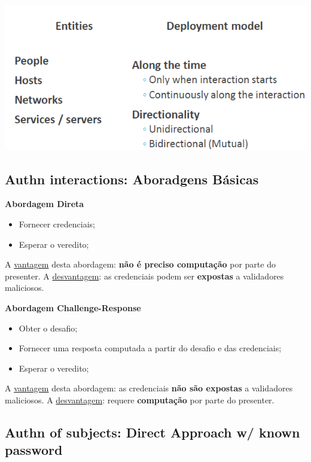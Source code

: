 \documentclass{article}
\begin{document}
\vspace{2mm}

\begin{center}
  \includegraphics[scale=0.55]{20}
\end{center}

\pagebreak

\subsection{Authn interactions: Aboradgens Básicas}

\begin{flushleft}
  \textbf{Abordagem Direta}
  \begin{itemize}
    \item Fornecer credenciais;
    \item Esperar o veredito;
  \end{itemize}
  A \uline{vantagem} desta abordagem: \textbf{não é preciso computação} por parte do presenter.
  A \uline{desvantagem}: as credenciais podem ser \textbf{expostas} a validadores maliciosos.

  \vspace{2mm}

  \textbf{Abordagem Challenge-Response}
  \begin{itemize}
    \item Obter o desafio;
    \item Fornecer uma resposta computada a partir do desafio e das credenciais;
    \item Esperar o veredito;
  \end{itemize}
  A \uline{vantagem} desta abordagem: as credenciais \textbf{não são expostas} a validadores maliciosos.
  A \uline{desvantagem}: requere \textbf{computação} por parte do presenter.
\end{flushleft}

\subsection{Authn of subjects: Direct Approach w/ known password}
\end{document}
